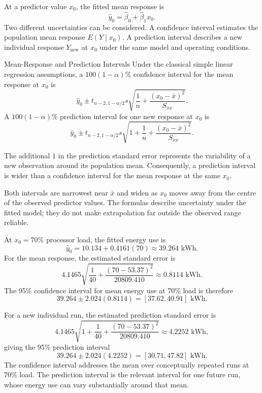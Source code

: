 At a predictor value $x_0$, the fitted mean response is
\[
\hat y_0=\hat\beta_0+\hat\beta_1x_0.
\]
Two different uncertainties can be considered. A confidence interval estimates the population mean response $E(Y\mid x_0)$. A prediction interval describes a new individual response $Y_{\mathrm{new}}$ at $x_0$ under the same model and operating conditions.

\newpage
\begin{theorem}{Mean-Response and Prediction Intervals}
Under the classical simple linear regression assumptions, a $100(1-\alpha)\%$ confidence interval for the mean response at $x_0$ is
\[
\hat y_0
\pm
t_{n-2,1-\alpha/2}s
\sqrt{
\frac{1}{n}
+\frac{(x_0-\bar x)^2}{S_{xx}}
}.
\]
A $100(1-\alpha)\%$ prediction interval for one new response at $x_0$ is
\[
\hat y_0
\pm
t_{n-2,1-\alpha/2}s
\sqrt{
1+\frac{1}{n}
+\frac{(x_0-\bar x)^2}{S_{xx}}
}.
\]
\end{theorem}

The additional $1$ in the prediction standard error represents the variability of a new observation around its population mean. Consequently, a prediction interval is wider than a confidence interval for the mean response at the same $x_0$.

Both intervals are narrowest near $\bar x$ and widen as $x_0$ moves away from the centre of the observed predictor values. The formulas describe uncertainty under the fitted model; they do not make extrapolation far outside the observed range reliable.

\begin{example}\par
At $x_0=70$\% processor load, the fitted energy use is
\[
\hat y_0
=10.134+0.4161(70)
\approx39.264\text{ kWh}.
\]
For the mean response, the estimated standard error is
\[
4.1465
\sqrt{
\frac{1}{40}
+\frac{(70-53.37)^2}{20809.410}
}
\approx0.8114\text{ kWh}.
\]
The 95\% confidence interval for mean energy use at 70\% load is therefore
\[
39.264\pm2.024(0.8114)
=[37.62,40.91]\text{ kWh}.
\]

For a new individual run, the estimated prediction standard error is
\[
4.1465
\sqrt{
1+\frac{1}{40}
+\frac{(70-53.37)^2}{20809.410}
}
\approx4.2252\text{ kWh},
\]
giving the 95\% prediction interval
\[
39.264\pm2.024(4.2252)
=[30.71,47.82]\text{ kWh}.
\]
The confidence interval addresses the mean over conceptually repeated runs at 70\% load. The prediction interval is the relevant interval for one future run, whose energy use can vary substantially around that mean.
\end{example}

